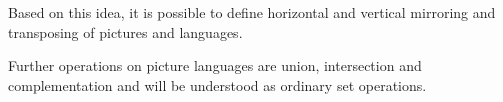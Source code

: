 Based on this idea, it is possible to define horizontal and vertical mirroring and transposing of
pictures and languages.
% 

Further operations on picture languages are union, intersection and complementation and will be
understood as ordinary set operations.